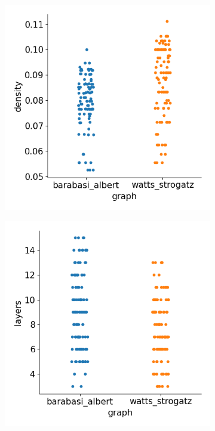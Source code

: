 \begin{figure}[H]
    \bigskip
    \begin{subfigure}{0.4\textwidth}
        \includegraphics[width=\linewidth]{images/results/random/tanh/graph_density.png}
        \caption{} \label{fig:tanh_graph_density}
    \end{subfigure}
    \hfill
    \begin{subfigure}{0.4\textwidth}
        \includegraphics[width=\linewidth]{images/results/random/tanh/graph_layers.png}
        \caption{} \label{fig:tanh_graph_layers}
    \end{subfigure}


\end{figure}
